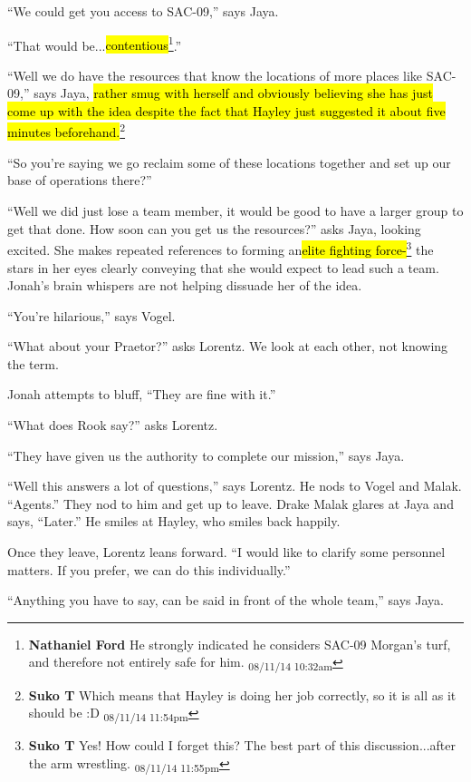 ``We could get you access to SAC-09,'' says Jaya.

``That would be...\hl{contentious}\footnote{\textbf{Nathaniel Ford }He strongly indicated he considers SAC-09 Morgan's turf, and therefore not entirely safe for him. \textsubscript{08/11/14 10:32am}}.''

``Well we do have the resources that know the locations of more places like SAC-09,'' says Jaya, \hl{rather smug with herself and obviously believing she has just come up with the idea despite the fact that Hayley just suggested it about five minutes beforehand.}\footnote{\textbf{Suko T }Which means that Hayley is doing her job correctly, so it is all as it should be :D \textsubscript{08/11/14 11:54pm}} 

``So you're saying we go reclaim some of these locations together and set up our base of operations there?''

``Well we did just lose a team member, it would be good to have a larger group to get that done.  How soon can you get us the resources?'' asks Jaya, looking excited.  She makes repeated references to forming an\hl{elite fighting force-}\footnote{\textbf{Suko T }Yes!  How could I forget this?  The best part of this discussion...after the arm wrestling. \textsubscript{08/11/14 11:55pm}} the stars in her eyes clearly conveying that she would expect to lead such a team.  Jonah's brain whispers are not helping dissuade her of the idea. 

``You're hilarious,'' says Vogel.

``What about your Praetor?'' asks Lorentz.  We look at each other, not knowing the term.  

Jonah attempts to bluff, ``They are fine with it.''

``What does Rook say?'' asks Lorentz.

``They have given us the authority to complete our mission,'' says Jaya.

``Well this answers a lot of questions,'' says Lorentz.  He nods to Vogel and Malak.  ``Agents.''  They nod to him and get up to leave.  Drake Malak glares at Jaya and says, ``Later.''  He smiles at Hayley, who smiles back happily.



Once they leave, Lorentz leans forward.  ``I would like to clarify some personnel matters.  If you prefer, we can do this individually.''

``Anything you have to say, can be said in front of the whole team,'' says Jaya.

